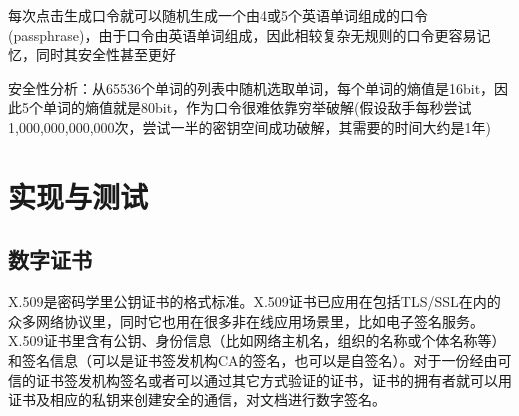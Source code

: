 \documentclass{ctexart}
\begin{document}
每次点击生成口令就可以随机生成一个由4或5个英语单词组成的口令(passphrase)，由于口令由英语单词组成，因此相较复杂无规则的口令更容易记忆，同时其安全性甚至更好

安全性分析：从65536个单词的列表中随机选取单词，每个单词的熵值是16bit，因此5个单词的熵值就是80bit，作为口令很难依靠穷举破解(假设敌手每秒尝试1,000,000,000,000次，尝试一半的密钥空间成功破解，其需要的时间大约是1年)
\section{实现与测试}
\subsection{数字证书}
X.509是密码学里公钥证书的格式标准。X.509证书已应用在包括TLS/SSL在内的众多网络协议里，同时它也用在很多非在线应用场景里，比如电子签名服务。X.509证书里含有公钥、身份信息（比如网络主机名，组织的名称或个体名称等）和签名信息（可以是证书签发机构CA的签名，也可以是自签名）。对于一份经由可信的证书签发机构签名或者可以通过其它方式验证的证书，证书的拥有者就可以用证书及相应的私钥来创建安全的通信，对文档进行数字签名。
\end{document}
